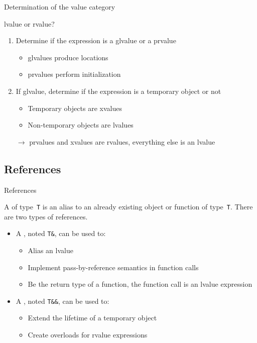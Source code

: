 \begin{frame}{Determination of the value category}{}
  \begin{block}{lvalue or rvalue?}
    \begin{enumerate}
    \item
      Determine if the expression is a glvalue or a prvalue
      \begin{itemize}
      \item
        glvalues produce locations
      \item
        prvalues perform initialization
      \end{itemize}
    \item
      If glvalue, determine if the expression is a temporary object or not
      \begin{itemize}
      \item
        Temporary objects are xvalues
      \item
        Non-temporary objects are lvalues
      \end{itemize}
    \item[$\to$]
      prvalues and xvalues are rvalues, everything else is an lvalue
    \end{enumerate}
  \end{block}
\end{frame}

\subsection{References}

\begin{frame}{References}{}
  \begin{definitions}[References]
    A  of type~\lstinline!T! is an alias to an already existing object or function of type~\lstinline!T!. There are two types of references.
    \begin{itemize}
    \item
      A , noted \lstinline!T&!, can be used to:
      \begin{itemize}
      \item
        Alias an lvalue
      \item
        Implement pass-by-reference semantics in function calls
      \item
        Be the return type of a function, the function call is an lvalue expression
      \end{itemize}
    \item
      A , noted \lstinline!T&&!, can be used to:
      \begin{itemize}
      \item
        Extend the lifetime of a temporary object
      \item
        Create overloads for rvalue expressions
      \end{itemize}
    \end{itemize}
  \end{definitions}
\end{frame}

